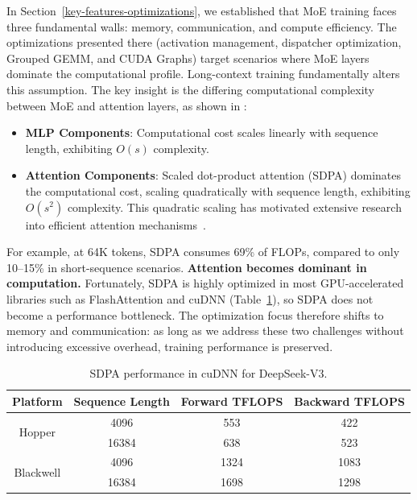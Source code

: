 \documentclass[10pt,logo,copyright]{nvidiatechreport}
\begin{document}
In Section~\ref{key-features-optimizations}, we established that MoE training faces three fundamental walls: memory, communication, and compute efficiency. The optimizations presented there (activation management, dispatcher optimization, Grouped GEMM, and CUDA Graphs) target scenarios where MoE layers dominate the computational profile. Long-context training fundamentally alters this assumption. The key insight is the differing computational complexity between MoE and attention layers, as shown in :
\begin{itemize}
    \item \textbf{MLP Components}: Computational cost scales linearly with sequence length, exhibiting $O(s)$ complexity.
    \item \textbf{Attention Components}: Scaled dot-product attention (SDPA) dominates the computational cost, scaling quadratically with sequence length, exhibiting $O(s^2)$ complexity. This quadratic scaling has motivated extensive research into efficient attention mechanisms~\cite{beltagy2020longformer,zaheer2020bigbird}.
\end{itemize}

For example, at 64K tokens, SDPA consumes 69\% of FLOPs, compared to only 10--15\% in short-sequence scenarios. \textbf{Attention becomes dominant in computation.} Fortunately, SDPA is highly optimized in most GPU-accelerated libraries such as FlashAttention \cite{dao2022flashattention,dao2023flashattention2,shah2024flashattention3} and cuDNN (Table~\ref{tab:sdpa-cudnn-perf}), so SDPA does not become a performance bottleneck. The optimization focus therefore shifts to memory and communication: as long as we address these two challenges without introducing excessive overhead, training performance is preserved.

\begin{table}[ht]
\centering
\caption{SDPA performance in cuDNN for DeepSeek-V3.}
\label{tab:sdpa-cudnn-perf}
\begin{tabular}{cccc}
\toprule
\textbf{Platform} & \textbf{Sequence Length} & \textbf{Forward TFLOPS} & \textbf{Backward TFLOPS} \\
\midrule
\multirow{2}{*}{Hopper}
 & 4096  & 553  & 422 \\
 & 16384 & 638  & 523 \\
\midrule
\multirow{2}{*}{Blackwell}
 & 4096  & 1324 & 1083 \\
 & 16384 & 1698 & 1298 \\
\bottomrule
\end{tabular}
\end{table}
\end{document}
